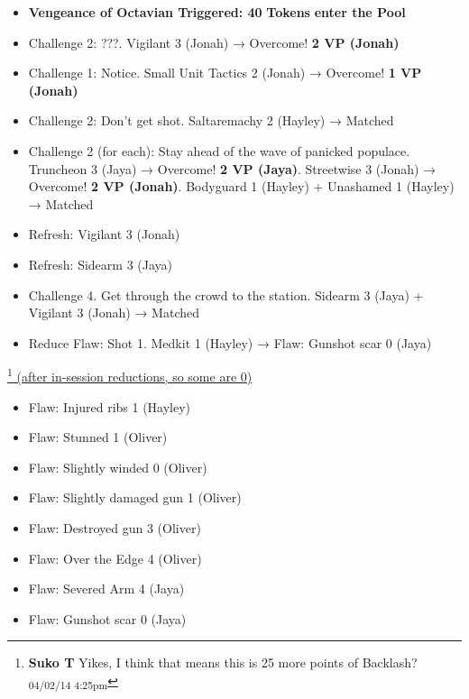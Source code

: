 \begin{itemize}
\item \textbf{Vengeance of Octavian Triggered: 40}\textbf{ Tokens}\textbf{ enter the Pool}
\item Challenge 2: ???.  Vigilant 3 (Jonah)  → Overcome! \textbf{2 VP (Jonah)}
\item Challenge 1: Notice.  Small Unit Tactics 2 (Jonah)  → Overcome! \textbf{1 VP (Jonah)}
\item Challenge 2: Don't get shot.  Saltaremachy 2 (Hayley) → Matched
\item Challenge 2 (for each): Stay ahead of the wave of panicked populace.   Truncheon 3 (Jaya)  → Overcome! \textbf{2 VP (Jaya)}.  Streetwise 3  (Jonah) → Overcome! \textbf{2 VP (Jonah)}. Bodyguard 1 (Hayley) + Unashamed 1 (Hayley)  → Matched
\item Refresh: Vigilant 3 (Jonah)
\item Refresh: Sidearm 3 (Jaya)
\item Challenge 4.  Get through the crowd to the station.  Sidearm 3 (Jaya) + Vigilant 3 (Jonah)  → Matched
\item Reduce Flaw: Shot 1.  Medkit 1 (Hayley) →   {\color[RGB]{255,0,0}Flaw: Gunshot scar 0 (Jaya)} 
\end{itemize}




\footnote{\textbf{Suko T }Yikes, I think that means this is 25 more points of Backlash? \textsubscript{04/02/14 4:25pm}}\underline{   (after in-session reductions, so some are 0) }

\begin{itemize}
\item  {\color[RGB]{255,0,0}Flaw: Injured ribs 1 (Hayley)} 
\item  {\color[RGB]{255,0,0}Flaw: Stunned 1 (Oliver)} 
\item  {\color[RGB]{255,0,0}Flaw: Slightly winded 0 (Oliver)} 
\item  {\color[RGB]{255,0,0}Flaw: Slightly damaged gun 1 (Oliver)} 
\item  {\color[RGB]{255,0,0}Flaw: Destroyed gun 3 (Oliver)} 
\item  {\color[RGB]{255,0,0}Flaw: Over the Edge 4 (Oliver)} 
\item  {\color[RGB]{255,0,0}Flaw: Severed Arm 4 (Jaya)} 
\item  {\color[RGB]{255,0,0}Flaw: Gunshot scar 0 (Jaya)} 
\end{itemize}





